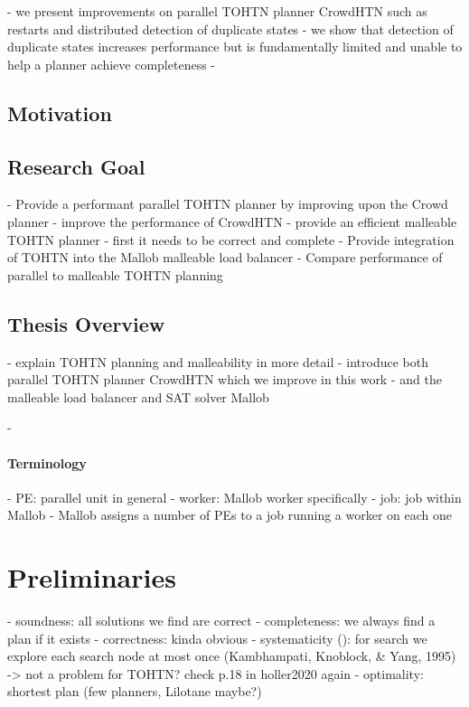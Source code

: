 \documentclass[enabledeprecatedfontcommands,12pt,a4paper,twoside]{scrartcl}
\numberwithin{equation}{section}
\begin{document}
- we present improvements on parallel TOHTN planner CrowdHTN such as restarts and distributed detection of duplicate states
- we show that detection of duplicate states increases performance but is fundamentally limited and unable to help a planner achieve completeness
- 

\subsection{Motivation}

\subsection{Research Goal}
- Provide a performant parallel TOHTN planner by improving upon the Crowd planner
- improve the performance of CrowdHTN
- provide an efficient malleable TOHTN planner
	- first it needs to be correct and complete
- Provide integration of TOHTN into the Mallob malleable load balancer
- Compare performance of parallel to malleable TOHTN planning

\subsection{Thesis Overview}
- explain TOHTN planning and malleability in more detail
	- introduce both parallel TOHTN planner CrowdHTN which we improve in this work
	- and the malleable load balancer and SAT solver Mallob

- 

\paragraph{Terminology}
- PE: parallel unit in general
- worker: Mallob worker specifically
- job: job within Mallob
- Mallob assigns a number of PEs to a job running a worker on each one

\section{Preliminaries}
- soundness: all solutions we find are correct
- completeness: we always find a plan if it exists
- correctness: kinda obvious
- systematicity (\cite{holler2020htn}): for search we explore each search node at most once (Kambhampati, Knoblock, \& Yang, 1995) -> not a problem for TOHTN? check p.18 in holler2020 again
- optimality: shortest plan (few planners, Lilotane maybe?)







\clearpage
\pagebreak
\end{document}

